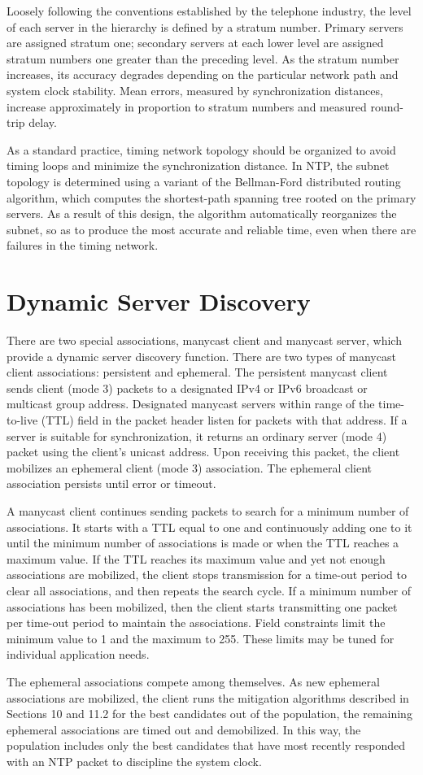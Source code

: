 Loosely following the conventions established by the telephone
industry, the level of each server in the hierarchy is defined by a
stratum number. Primary servers are assigned stratum one; secondary
servers at each lower level are assigned stratum numbers one greater
than the preceding level. As the stratum number increases, its
accuracy degrades depending on the particular network path and system
clock stability. Mean errors, measured by synchronization distances,
increase approximately in proportion to stratum numbers and measured
round-trip delay.

As a standard practice, timing network topology should be organized
to avoid timing loops and minimize the synchronization distance. In
NTP, the subnet topology is determined using a variant of the
Bellman-Ford distributed routing algorithm, which computes the
shortest-path spanning tree rooted on the primary servers. As a
result of this design, the algorithm automatically reorganizes the
subnet, so as to produce the most accurate and reliable time, even
when there are failures in the timing network.

\section{Dynamic Server Discovery}

There are two special associations, manycast client and manycast
server, which provide a dynamic server discovery function. There are
two types of manycast client associations: persistent and ephemeral.
The persistent manycast client sends client (mode 3) packets to a
designated IPv4 or IPv6 broadcast or multicast group address.
Designated manycast servers within range of the time-to-live (TTL)
field in the packet header listen for packets with that address. If
a server is suitable for synchronization, it returns an ordinary
server (mode 4) packet using the client’s unicast address. Upon
receiving this packet, the client mobilizes an ephemeral client (mode
3) association. The ephemeral client association persists until
error or timeout.

A manycast client continues sending packets to search for a minimum
number of associations. It starts with a TTL equal to one and
continuously adding one to it until the minimum number of
associations is made or when the TTL reaches a maximum value. If the
TTL reaches its maximum value and yet not enough associations are
mobilized, the client stops transmission for a time-out period to
clear all associations, and then repeats the search cycle. If a
minimum number of associations has been mobilized, then the client
starts transmitting one packet per time-out period to maintain the
associations. Field constraints limit the minimum value to 1 and the
maximum to 255. These limits may be tuned for individual application
needs.

The ephemeral associations compete among themselves. As new
ephemeral associations are mobilized, the client runs the mitigation
algorithms described in Sections 10 and 11.2 for the best candidates
out of the population, the remaining ephemeral associations are timed
out and demobilized. In this way, the population includes only the
best candidates that have most recently responded with an NTP packet
to discipline the system clock.
